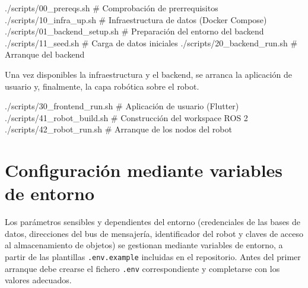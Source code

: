 \begin{bashcode}[title={Despliegue de la infraestructura y el backend}]
./scripts/00_prereqs.sh        # Comprobación de prerrequisitos
./scripts/10_infra_up.sh       # Infraestructura de datos (Docker Compose)
./scripts/01_backend_setup.sh  # Preparación del entorno del backend
./scripts/11_seed.sh           # Carga de datos iniciales
./scripts/20_backend_run.sh    # Arranque del backend
\end{bashcode}

Una vez disponibles la infraestructura y el backend, se arranca la aplicación de
usuario y, finalmente, la capa robótica sobre el robot.

\begin{bashcode}[title={Despliegue del frontend y de la capa robótica}]
./scripts/30_frontend_run.sh   # Aplicación de usuario (Flutter)
./scripts/41_robot_build.sh    # Construcción del workspace ROS 2
./scripts/42_robot_run.sh      # Arranque de los nodos del robot
\end{bashcode}

\section{Configuración mediante variables de entorno}
\label{sec:configuracion-despliegue}

Los parámetros sensibles y dependientes del entorno (credenciales de las bases de
datos, direcciones del bus de mensajería, identificador del robot y claves de
acceso al almacenamiento de objetos) se gestionan mediante variables de entorno,
a partir de las plantillas \texttt{.env.example} incluidas en el repositorio.
Antes del primer arranque debe crearse el fichero \texttt{.env} correspondiente y
completarse con los valores adecuados.
